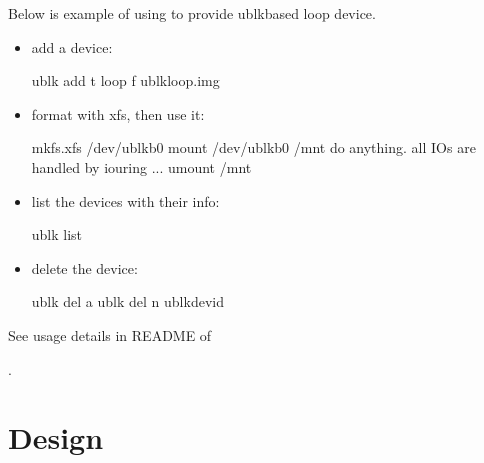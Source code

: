 \documentclass[a4paper,11pt,english]{sphinxmanual}
\begin{document}
Below is example of using  to provide ublk\sphinxhyphen{}based loop device.
\begin{itemize}
\item {} 
add a device:

\begin{sphinxVerbatim}[commandchars=\\\{\}]
ublk add \PYGZhy{}t loop \PYGZhy{}f ublk\PYGZhy{}loop.img
\end{sphinxVerbatim}

\item {} 
format with xfs, then use it:

\begin{sphinxVerbatim}[commandchars=\\\{\}]
mkfs.xfs /dev/ublkb0
mount /dev/ublkb0 /mnt
\PYGZsh{} do anything. all IOs are handled by io\PYGZus{}uring
...
umount /mnt
\end{sphinxVerbatim}

\item {} 
list the devices with their info:

\begin{sphinxVerbatim}[commandchars=\\\{\}]
ublk list
\end{sphinxVerbatim}

\item {} 
delete the device:

\begin{sphinxVerbatim}[commandchars=\\\{\}]
ublk del \PYGZhy{}a
ublk del \PYGZhy{}n \PYGZdl{}ublk\PYGZus{}dev\PYGZus{}id
\end{sphinxVerbatim}

\end{itemize}

See usage details in README of  %
\begin{footnote}[4]\sphinxAtStartFootnote
{}
%
\end{footnote}.


\section{Design}
\label{\detokenize{ublk:design}}
\end{document}
